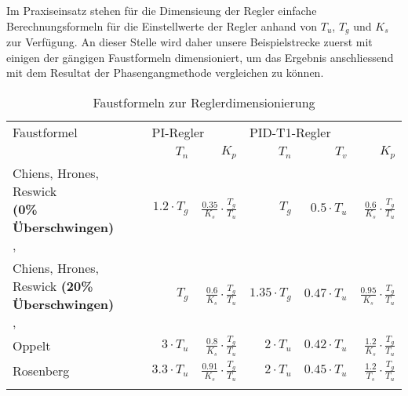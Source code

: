 Im   Praxiseinsatz  stehen   f\"ur   die  Dimensieung   der  Regler   einfache
Berechnungsformeln f\"ur die Einstellwerte der  Regler anhand von $T_u$, $T_g$
und $K_s$ zur Verf\"ugung. An dieser  Stelle wird daher unsere Beispielstrecke
zuerst mit einigen der g\"angigen  Faustformeln dimensioniert, um das Ergebnis
anschliessend mit dem Resultat der Phasengangmethode vergleichen zu k\"onnen.

\begin{longtable}{p{50mm}rrrrr}
    \toprule


    Faustformel
    &
    \multicolumn{2}{l}{PI-Regler}
    &
    \multicolumn{2}{l}{PID-T1-Regler}
    \\

    &
    $T_n$
    &
    $K_p$
    &
    $T_n$
    &
    $T_v$
    &
    $K_p$
    \\

    \midrule

    \endhead
    \endfoot
    \endlastfoot


    \pbox{45mm}{Chiens, Hrones, Reswick \\ \small{\textbf{(0\% \"Uberschwingen)}} \\ \cite{ref:chiens_tsn}, \cite{ref:chiens_wiki}}
    &
    $1.2\cdot T_g$
    &
    $\frac{0.35}{K_s} \cdot \frac{T_g}{T_u}$
    &
    $T_g$
    &
    $0.5\cdot T_u$
    &
    $ \frac{0.6}{K_s} \cdot \frac{T_g}{T_u} $
    \\

    \addlinespace[1em]

    \pbox{45mm}{Chiens, Hrones, Reswick \small{\textbf{(20\% \"Uberschwingen)}} \\ \cite{ref:chiens_tsn}, \cite{ref:chiens_wiki}}
    &
    $T_g$
    &
    $\frac{0.6}{K_s} \cdot \frac{T_g}{T_u}$
    &
    $1.35\cdot T_g$
    &
    $0.47 \cdot T_u$
    &
    $ \frac{0.95}{K_s} \cdot \frac{T_g}{T_u} $
    \\

    \addlinespace[1em]

    Oppelt \cite{ref:op_ros_zieg}
    &
    $3 \cdot T_u$
    &
    $\frac{0.8}{K_s} \cdot \frac{T_g}{T_u}$
    &
    $2 \cdot T_u$
    &
    $ 0.42 \cdot T_u $
    &
    $ \frac{1.2}{K_s} \cdot \frac{T_g}{T_u} $
    \\

    \addlinespace[1em]

    Rosenberg \cite{ref:op_ros_zieg}
    &
    $3.3 \cdot T_u $
    &
    $ \frac{0.91}{K_s} \cdot \frac{T_g}{T_u} $
    &
    $ 2 \cdot T_u $
    &
    $ 0.45 \cdot T_u $
    &
    $ \frac{1.2}{T_s} \cdot \frac{T_g}{T_u}$
    \\

    \addlinespace[1em]

    \bottomrule
\caption{Faustformeln zur Reglerdimensionierung}
\label{tab:faustformeln}
\end{longtable}


